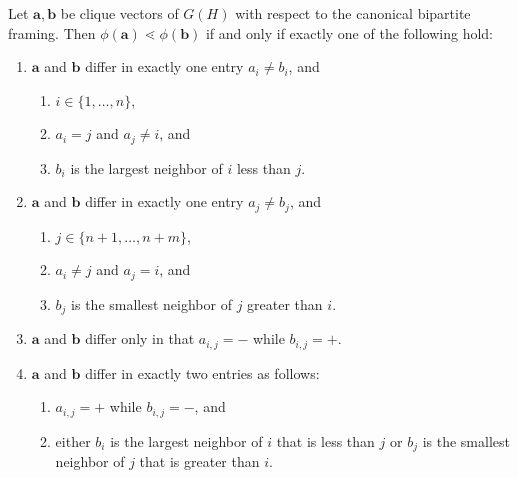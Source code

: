 \documentclass[10pt,a4paper]{amsart}
\newcommand\ba{\mathbf{a}}
\newcommand\bb{\mathbf{b}}
\begin{document}
\begin{proposition}\label{prop:cover}
    Let $\ba, \bb$ be clique vectors of $G(H)$ with respect to the canonical bipartite framing.
    Then $\phi(\ba) \lessdot \phi(\bb)$ if and only if exactly one of the following hold:
    \begin{enumerate}
        \item $\ba$ and $\bb$ differ in exactly one entry $a_i \neq b_i$, and
            \begin{enumerate}
                \item $i \in \{1,\dots,n\}$,
                \item $a_i = j$ and $a_j \neq i$, and
                \item $b_i$ is the largest neighbor of $i$ less than $j$.
            \end{enumerate}
        \item $\ba$ and $\bb$ differ in exactly one entry $a_j \neq b_j$, and
            \begin{enumerate}
                \item $j \in \{n+1,\dots,n+m\}$,
                \item $a_i \neq j$ and $a_j = i$, and
                \item $b_j$ is the smallest neighbor of $j$ greater than $i$.
            \end{enumerate}
        \item $\ba$ and $\bb$ differ only in that $a_{i,j} = -$ while $b_{i,j} = +$.
        \item $\ba$ and $\bb$ differ in exactly two entries as follows:
            \begin{enumerate}
                \item $a_{i,j} = +$ while $b_{i,j} = -$, and
                \item either $b_i$ is the largest neighbor of $i$ that is less than $j$ or $b_j$ is the smallest neighbor of $j$ that is greater than $i$.
            \end{enumerate}
    \end{enumerate}
\end{proposition}
\end{document}
